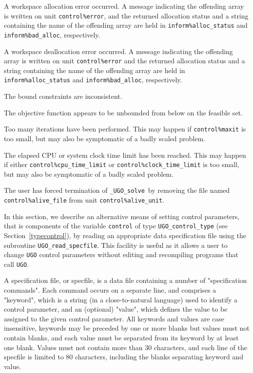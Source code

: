 \documentclass{galahad}
\newcommand{\packagename}{UGO}
\newcommand{\fullpackagename}{\libraryname\_\packagename}
\newcommand{\solver}{{\tt \fullpackagename\_solve}}
\begin{document}
\begin{description}

 A workspace allocation error occurred.
A message indicating the offending
array is written on unit {\tt control\%error}, and the returned allocation
status and a string containing the name of the offending array
are held in {\tt inform\%alloc\_\-status}
and {\tt inform\%bad\_alloc}, respectively.

 A workspace deallocation error occurred.
A message indicating the offending
array is written on unit {\tt control\%error} and the returned allocation
status and a string containing the name of the offending array
are held in {\tt inform\%alloc\_\-status}
and {\tt inform\%bad\_alloc}, respectively.

 The bound constraints are inconsistent.

  The objective function appears to be unbounded
 from below on the feasible set.

 Too many iterations have been performed.
  This may happen if
    {\tt control\%maxit} is too small, but may also be symptomatic of
    a badly scaled problem.

 The elapsed CPU or system clock time limit has been
    reached. This may happen if either {\tt control\%cpu\_time\_limit} or
    {\tt control\%clock\_time\_limit} is too small, but may also be symptomatic
    of a badly scaled problem.

 The user has forced termination of \solver\
     by removing the file named {\tt control\%a\-live\_file} from
     unit {\tt control\%alive\_unit}.

\end{description}


\galfeatures
\noindent In this section, we describe an alternative means of setting
control parameters, that is components of the variable {\tt control} of type
{\tt \packagename\_control\_type}
(see Section~\ref{typecontrol}),
by reading an appropriate data specification file using the
subroutine {\tt \packagename\_read\_specfile}. This facility
is useful as it allows a user to change  {\tt \packagename} control parameters
without editing and recompiling programs that call {\tt \packagename}.

A specification file, or specfile, is a data file containing a number of
"specification commands". Each command occurs on a separate line,
and comprises a "keyword",
which is a string (in a close-to-natural language) used to identify a
control parameter, and
an (optional) "value", which defines the value to be assigned to the given
control parameter. All keywords and values are case insensitive,
keywords may be preceded by one or more blanks but
values must not contain blanks, and
each value must be separated from its keyword by at least one blank.
Values must not contain more than 30 characters, and
each line of the specfile is limited to 80 characters,
including the blanks separating keyword and value.
\end{document}
